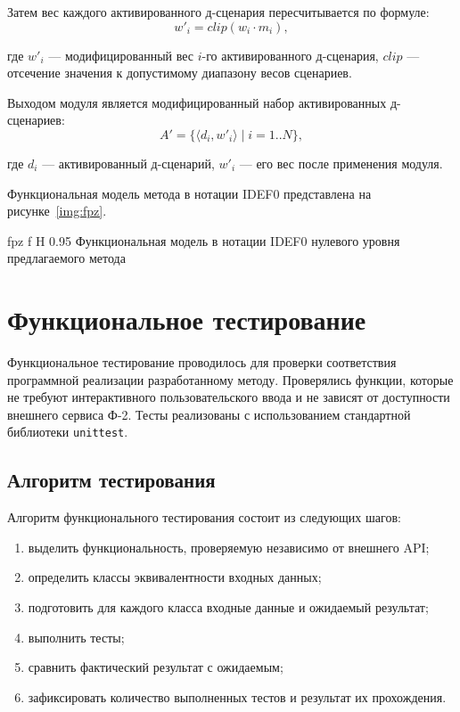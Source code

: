 Затем вес каждого активированного д-сценария пересчитывается по формуле:
\begin{equation}
	\label{eq:modified_weight}
	w'_i = clip(w_i \cdot m_i),
\end{equation}

где \(w'_i\) --- модифицированный вес \(i\)-го активированного д-сценария, \(clip\) --- отсечение значения к допустимому диапазону весов сценариев.

Выходом модуля является модифицированный набор активированных д-сценариев:
\begin{equation}
	\label{eq:method_output}
	A' = \{\langle d_i, w'_i \rangle \mid i = 1..N\},
\end{equation}

где \(d_i\) --- активированный д-сценарий, \(w'_i\) --- его вес после применения модуля.

Функциональная модель метода в нотации IDEF0 представлена на рисунке~\ref{img:fpz}.

{fpz}
{f}
{H}
{0.95\textwidth}
{Функциональная модель в нотации IDEF0 нулевого уровня предлагаемого метода}

\chapter{Функциональное тестирование}

Функциональное тестирование проводилось для проверки соответствия
программной реализации разработанному методу.
Проверялись функции, которые не требуют интерактивного пользовательского ввода и не зависят от доступности
внешнего сервиса Ф-2.
Тесты реализованы с использованием стандартной библиотеки \texttt{unittest}.

\section{Алгоритм тестирования}

Алгоритм функционального тестирования состоит из следующих шагов:
\begin{enumerate}
	\item выделить функциональность, проверяемую независимо от внешнего API;
	\item определить классы эквивалентности входных данных;
	\item подготовить для каждого класса входные данные и ожидаемый результат;
	\item выполнить тесты;
	\item сравнить фактический результат с ожидаемым;
	\item зафиксировать количество выполненных тестов и результат их прохождения.
\end{enumerate}

